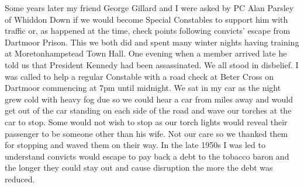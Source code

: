 Some years later my friend George Gillard and I were asked by PC Alan Parsley of
Whiddon Down if we would become Special Constables to support him with traffic
or, as happened at the time, check points following convicts' escape from
Dartmoor Prison. This we both did and spent many winter nights having training
at Moretonhampstead Town Hall. One evening when a member arrived late he told
us that President Kennedy had been assassinated. We all stood in disbelief. I
was called to help a regular Constable with a road check at Beter Cross on
Dartmoor commencing at 7pm until midnight. We sat in my car as the night grew
cold with heavy fog due so we could hear a car from miles away and would get
out of the car standing on each side of the road and wave our torches at the
car to stop. Some would not wish to stop as our torch lights would reveal their
passenger to be someone other than his wife. Not our care so we thanked them
for stopping and waved them on their way. In the late 1950s I was led to
understand convicts would escape to pay back a debt to the tobacco baron and
the longer they could stay out and cause disruption the more the debt was
reduced.
